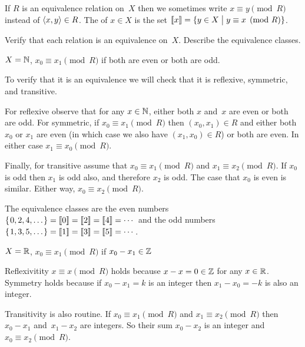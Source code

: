 \documentclass{ibl}  %
\begin{document}
\begin{df}
If $R$ is an equivalence relation on~$X$ then 
we sometimes write $x\equiv y\pmod R$ instead of $\langle x,y\rangle\in R$.
The  of $x\in X$ is the set
$\llbracket x \rrbracket=\{y\in X \bigm| y\equiv x\pmod R\}$.   
\end{df}

\begin{problem}[\midlength] 
  Verify that each relation is an equivalence on~$X$.
  Describe the equivalence classes.
\begin{exes}
\begin{exercise} 
  $X=\mathbb{N}$, $x_0\equiv x_1 \pmod R$ if both are even or both are odd. 
\end{exercise}
\begin{answer}
  To verify that it is an equivalence we will check that it is reflexive,
  symmetric, and transitive.

  For reflexive observe that for any $x\in\mathbb{N}$, either both $x$ and~$x$
  are even or both are odd.
  For symmetric, if $x_0\equiv x_1\pmod R$ then $(x_0,x_1)\in R$
  and either both $x_0$ or $x_1$ are even (in which case we also have
  $(x_1,x_0)\in R$) or both are even.
  In either case $x_1\equiv x_0\pmod R$.

  Finally, for transitive assume that $x_0\equiv x_1\pmod R$
  and $x_1\equiv x_2\pmod R$.
  If $x_0$ is odd then $x_1$ is odd also, and therefore $x_2$ is odd.
  The case that $x_0$ is even is similar.
  Either way, $x_0\equiv x_2\pmod R$.

  The equivalence classes are the even numbers
  $\mbox{$\{\hspace{0.1em}0,2,4,\ldots\hspace{0.1em}\}$}=\llbracket 0 \rrbracket=\llbracket 2 \rrbracket=\llbracket 4 \rrbracket=\cdots$
  and the odd numbers
  $\mbox{$\{\hspace{0.1em}1,3,5,\ldots\hspace{0.1em}\}$}=\llbracket 1 \rrbracket=\llbracket 3 \rrbracket=\llbracket 5 \rrbracket=\cdots$.
\end{answer}
\begin{exercise} 
      $X=\mathbb{R}$, $x_0\equiv x_1\pmod R$ if $x_0-x_1\in \mathbb{Z}$
\end{exercise}
\begin{answer}
  Reflexivitity $x\equiv x\pmod R$ holds because $x-x=0\in\mathbb{Z}$ for any $x\in\mathbb{R}$. 
  Symmetry holds because if $x_0-x_1=k$ is an integer then $x_1-x_0=-k$ is also
  an integer.

  Transitivity is also routine.
  If $x_0\equiv x_1\pmod R$ and $x_1\equiv x_2\pmod R$ then
  $x_0-x_1$ and~$x_1-x_2$ are integers.
  So their sum $x_0-x_2$ is an integer and $x_0\equiv x_2\pmod R$.  


\end{answer}
\end{exes}
\end{problem}
\end{document}
